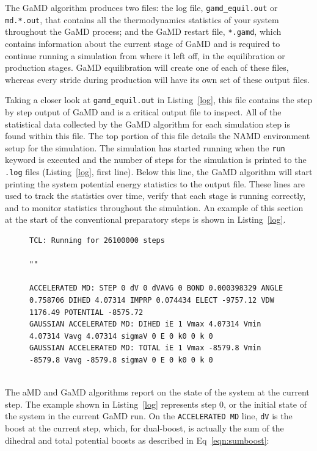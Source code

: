 \documentclass[9pt,tutorial]{livecoms}
\begin{document}
The GaMD algorithm produces two files: the log file, \texttt{gamd\_equil.out} or \texttt{md.*.out}, that contains all the thermodynamics statistics of your system throughout the GaMD process; and the GaMD restart file, \texttt{*.gamd}, which contains information about the current stage of GaMD and is required to continue running a simulation from where it left off, in the equilibration or production stages. GaMD equilibration will create one of each of these files, whereas every stride during production will have its own set of these output files.

Taking a closer look at \texttt{gamd\_equil.out} in Listing~\ref{log}, this file contains the step by step output of GaMD and is a critical output file to inspect. All of the statistical data collected by the GaMD algorithm for each simulation step is found within this file. The top portion of this file details the NAMD environment setup for the simulation. The simulation has started running when the \texttt{run} keyword is executed and the number of steps for the simulation is printed to the \texttt{.log} files (Listing~\ref{log}, first line). Below this line, the GaMD algorithm will start printing the system potential energy statistics to the output file. These lines are used to track the statistics over time, verify that each stage is running correctly, and to monitor statistics throughout the simulation. An example of this section at the start of the conventional preparatory steps is shown in Listing~\ref{log}.

\begin{figure}[h!]
\begin{lstlisting}[label=log,caption=gamd\_equil.out, basicstyle=\small,breaklines=true, backgroundcolor=\color{light-gray}]
TCL: Running for 26100000 steps

""

ACCELERATED MD: STEP 0 dV 0 dVAVG 0 BOND 0.000398329 ANGLE 0.758706 DIHED 4.07314 IMPRP 0.074434 ELECT -9757.12 VDW 1176.49 POTENTIAL -8575.72
GAUSSIAN ACCELERATED MD: DIHED iE 1 Vmax 4.07314 Vmin 4.07314 Vavg 4.07314 sigmaV 0 E 0 k0 0 k 0
GAUSSIAN ACCELERATED MD: TOTAL iE 1 Vmax -8579.8 Vmin -8579.8 Vavg -8579.8 sigmaV 0 E 0 k0 0 k 0
   
\end{lstlisting}
\end{figure}

The aMD and GaMD algorithms report on the state of the system at the current step. The example shown in Listing~\ref{log} represents step 0, or the initial state of the system in the current GaMD run. On the \texttt{ACCELERATED MD} line, \texttt{dV} is the boost at the current step, which, for dual-boost, is actually the sum of the dihedral and total potential boosts as described in Eq~\ref{eqn:sumboost}: 
\end{document}
